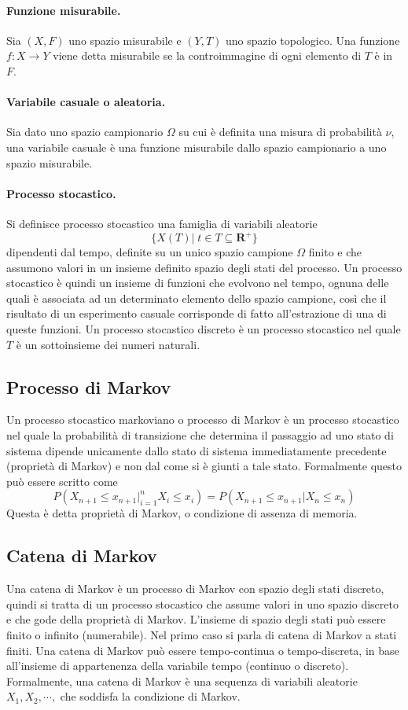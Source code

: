 \paragraph{Funzione misurabile.}
Sia $(X,F)$ uno spazio misurabile e $(Y,T)$ uno spazio topologico. Una funzione $f:X\rightarrow Y$ viene detta misurabile se la controimmagine di ogni elemento di $T$ \`e in $F$.


\paragraph{Variabile casuale o aleatoria.}
Sia dato uno spazio campionario $\Omega$ su cui \`e definita una misura di probabilit\`a $\nu$, una variabile casuale \`e una funzione misurabile dallo spazio campionario a uno spazio misurabile. 


\paragraph{Processo stocastico.}
Si definisce processo stocastico una famiglia di variabili aleatorie  
\[
  \{X(T)|\; t\in T\subseteq \mathbf{R}^{+}\}
\]
dipendenti dal tempo, definite su un unico spazio campione $\Omega$ finito e che assumono valori in un insieme definito spazio degli stati del processo. Un processo stocastico \`e quindi un insieme di funzioni che evolvono nel tempo, ognuna delle quali \`e associata ad un determinato elemento dello spazio campione, cos\`i che il risultato di un esperimento casuale corrisponde di fatto all'estrazione di una di queste funzioni.
Un processo stocastico discreto \`e un processo stocastico nel quale $T$ \`e un sottoinsieme dei numeri naturali.


\subsection{Processo di Markov}
Un processo stocastico markoviano o processo di Markov \`e un processo stocastico nel quale la probabilit\`a di transizione che determina il passaggio ad uno stato di sistema dipende unicamente dallo stato di sistema immediatamente precedente (propriet\`a di Markov) e non dal come si \`e giunti a tale stato. Formalmente questo pu\`o essere scritto come
\[P(X_{n+1}\leq x_{n+1} |_{i=1}^{n} X_{i}\leq x_{i}) = P(X_{n+1}\leq x_{n+1} | X_{n}\leq x_{n})\]
Questa \`e detta propriet\`a di Markov, o condizione di assenza di memoria.

\subsection{Catena di Markov}
Una catena di Markov \`e un processo di Markov con spazio degli stati discreto, quindi si tratta di un processo stocastico che assume valori in uno spazio discreto e che gode della propriet\`a di Markov. L'insieme  di spazio degli stati pu\`o essere finito o infinito (numerabile). Nel primo caso si parla di catena di Markov a stati finiti. Una catena di Markov pu\`o essere tempo-continua o tempo-discreta, in base all'insieme di appartenenza della variabile tempo (continuo o discreto).
Formalmente, una catena di Markov \`e una sequenza di variabili aleatorie $X_{1}, X_{2}, \cdots, $ che soddisfa la condizione di Markov.


